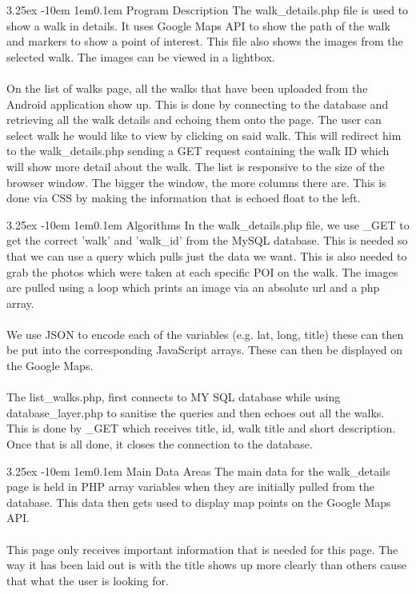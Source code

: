 \documentclass[12pt]{article}
\makeatletter
\renewcommand{\paragraph}{
  \@startsection{paragraph}{4}
  {\z@}{3.25ex \@plus -10em \@minus 1em}{0.1em}
  {\normalfont\normalsize\bfseries}
}
\makeatother
\begin{document}
\paragraph{Program Description} 
The walk\_details.php file is used to show a walk in details. It uses Google Maps API to show the path of the walk and markers to show a point of interest. This file also shows the images from the selected walk. The images can be viewed in a lightbox.
~\\\\
On the list of walks page, all the walks that have been uploaded from the Android application show up. This is done by connecting to the database and retrieving all the walk details and echoing them onto the page. The user can select walk he would like to view by clicking on said walk. This will redirect him to the walk\_details.php sending a GET request containing the walk ID which will show more detail about the walk.  The list is responsive to the size of the browser window. The bigger the window, the more columns there are. This is done via CSS by making the information that is echoed float to the left.

\paragraph{Algorithms}
In the walk\_details.php file, we use \textdollar\_GET to get the correct 'walk' and 'walk\_id' from the MySQL database. This is needed so that we can use a query which pulls just the data we want. This is also needed to grab the photos which were taken at each specific POI on the walk. The images are pulled using a loop which prints an image via an absolute url and a php array.
~\\\\
We use JSON to encode each of the variables (e.g. \textdollar lat, \textdollar long, \textdollar title) these can then be put into the corresponding JavaScript arrays. These can then be displayed on the Google Maps. 
~\\\\
The list\_walks.php, first connects to MY SQL database while using \newline database\_layer.php to sanitise the queries and then echoes out all the walks. This is done by \textdollar\_GET which receives title, id, walk title and short description. Once that is all done, it closes the connection to the database.
\paragraph{Main Data Areas}
The main data for the walk\_details page is held in PHP array variables when they are initially pulled from the database. This data then gets used to display map points on the Google Maps API.
~\\\\
This page only receives important information that is needed for this page.  The way it has been laid out is with the title shows up more clearly than others cause that what the user is looking for.
\end{document}
